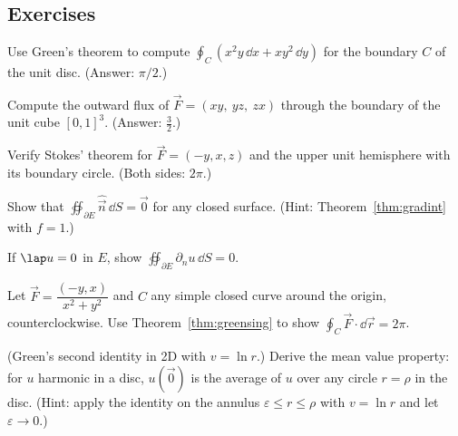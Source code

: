 \subsection*{Exercises}
\begin{exercise}
Use Green's theorem to compute $\oint_C(x^2y\,\dd x+xy^2\,\dd y)$ for the boundary $C$ of the unit disc. (Answer: $\pi/2$.)
\end{exercise}
\begin{exercise}
Compute the outward flux of $\vec F=(xy,\ yz,\ zx)$ through the boundary of the unit cube $[0,1]^3$. (Answer: $\tfrac32$.)
\end{exercise}
\begin{exercise}
Verify Stokes' theorem for $\vec F=(-y,x,z)$ and the upper unit hemisphere with its boundary circle. (Both sides: $2\pi$.)
\end{exercise}
\begin{exercise}
Show that $\oiint_{\partial E}\hat{\vec n}\,\dd S=\vec0$ for any closed surface. (Hint: Theorem~\ref{thm:gradint} with $f=1$.)
\end{exercise}
\begin{exercise}
If $\lap u=0$ in $E$, show $\oiint_{\partial E}\partial_nu\,\dd S=0$.
\end{exercise}
\begin{exercise}
Let $\vec F=\dfrac{(-y,x)}{x^2+y^2}$ and $C$ any simple closed curve around the origin, counterclockwise. Use Theorem~\ref{thm:greensing} to show $\oint_C\vec F\cdot\dd\vec r=2\pi$.
\end{exercise}
\begin{exercise}
(Green's second identity in 2D with $v=\ln r$.) Derive the mean value property: for $u$ harmonic in a disc, $u(\vec 0)$ is the average of $u$ over any circle $r=\rho$ in the disc. (Hint: apply the identity on the annulus $\varepsilon\le r\le\rho$ with $v=\ln r$ and let $\varepsilon\to0$.)
\end{exercise}

